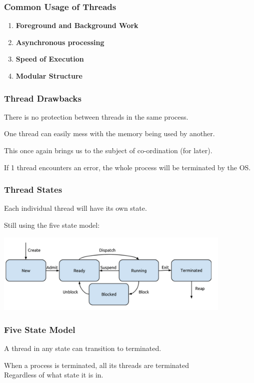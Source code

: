 \begin{frame}
	\frametitle{Common Usage of Threads}

	\begin{enumerate}
		\item \textbf{Foreground and Background Work}
		\item \textbf{Asynchronous processing}
		\item \textbf{Speed of Execution}
		\item \textbf{Modular Structure}
	\end{enumerate}

\end{frame}

\begin{frame}
	\frametitle{Thread Drawbacks}

	There is no protection between threads in the same process.

	One thread can easily mess with the memory being used by another.

	This once again brings us to the subject of co-ordination (for later).

	If 1 thread encounters an error, the whole process will be terminated by the OS.

\end{frame}

\begin{frame}
	\frametitle{Thread States}
	Each individual thread will have its own state.
	
	Still using the five state model:

	\begin{center}
		\includegraphics[width=0.85\textwidth]{images/5-state-model.png}
	\end{center}

\end{frame}

\begin{frame}
	\frametitle{Five State Model}

    A thread in any state can transition to terminated.

	When a process is terminated, all its threads are terminated\\
	\quad Regardless of what state it is in.


\end{frame}


